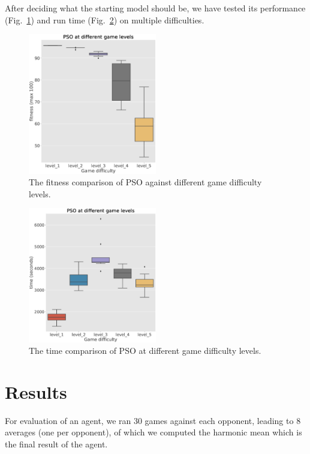 \documentclass[conference]{IEEEtran}
\begin{document}
    After deciding what the starting model should be, we have tested its performance (Fig.~\ref{fig:pso_levels})
    and run time (Fig.~\ref{fig:pso_levels_time}) on multiple difficulties.

    \begin{figure}[!h]
        \centering
        \includegraphics[width=0.5\textwidth]{old_images/pso_levels.eps}
        \caption{The fitness comparison of PSO against different game difficulty levels.}
        \label{fig:pso_levels}
    \end{figure}


    \begin{figure}[!h]
        \centering
        \includegraphics[width=0.5\textwidth]{old_images/pso_levels_time.eps}
        \caption{The time comparison of PSO at different game difficulty levels.}
        \label{fig:pso_levels_time}
    \end{figure}


    \section{Results}\label{sec:results}
    For evaluation of an agent, we ran 30 games against each opponent, leading to 8 averages
    (one per opponent), of which we computed the harmonic mean which is the final result of the agent.
\end{document}
